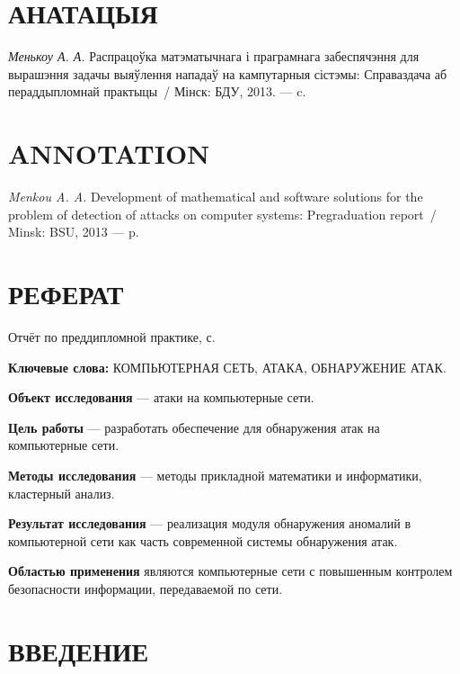 \medskip


\section*{АНАТАЦЫЯ}

\textit{Менькоу А. А.} Распрацоўка матэматычнага і праграмнага забеспячэння для вырашэння задачы выяўлення нападаў на кампутарныя сістэмы: Справаздача аб пераддыпломнай практыцы~/ Мінск: 
БДУ, 2013. --- \pagescount c.

\medskip


\section*{ANNOTATION}

\textit{Menkou A. A.} Development of mathematical and software solutions for the problem of detection of attacks on computer systems:
Pregraduation report~/ Minsk: BSU, 2013 --- \pagescount p.

\medskip

\newpage

\section*{РЕФЕРАТ}

Отчёт по преддипломной практике, \pagescount с.

\medskip
\textbf{Ключевые слова:} КОМПЬЮТЕРНАЯ СЕТЬ, АТАКА, ОБНАРУЖЕНИЕ АТАК.

\medskip
\textbf{Объект исследования} --- атаки на компьютерные сети.

\textbf{Цель работы} --- разработать обеспечение для обнаружения атак на компьютерные сети.

\textbf{Методы исследования} --- методы прикладной математики и информатики, 
кластерный анализ.

\textbf{Результат исследования} --- реализация модуля обнаружения аномалий в компьютерной сети как часть современной системы обнаружения атак.

\textbf{Областью применения} являются компьютерные сети с повышенным контролем безопасности информации, передаваемой по сети.

\newpage

\renewcommand{\contentsname}{СОДЕРЖАНИЕ}
\tableofcontents

\newpage

\section*{ВВЕДЕНИЕ}

